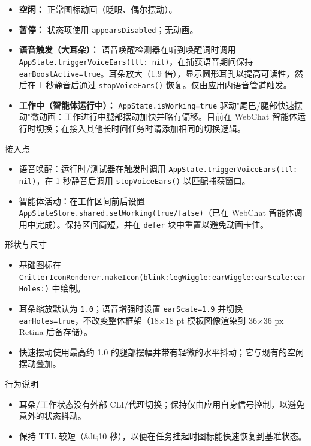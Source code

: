 \begin{itemize}
  \item \textbf{空闲：} 正常图标动画（眨眼、偶尔摆动）。
  \item \textbf{暂停：} 状态项使用 \texttt{appearsDisabled}；无动画。
  \item \textbf{语音触发（大耳朵）：} 语音唤醒检测器在听到唤醒词时调用 \texttt{AppState.triggerVoiceEars(ttl: nil)}，在捕获语音期间保持 \texttt{earBoostActive=true}。耳朵放大（1.9 倍），显示圆形耳孔以提高可读性，然后在 1 秒静音后通过 \texttt{stopVoiceEars()} 恢复。仅由应用内语音管道触发。
  \item \textbf{工作中（智能体运行中）：} \texttt{AppState.isWorking=true} 驱动"尾巴/腿部快速摆动"微动画：工作进行中腿部摆动加快并略有偏移。目前在 WebChat 智能体运行时切换；在接入其他长时间任务时请添加相同的切换逻辑。
\end{itemize}


接入点

\begin{itemize}
  \item 语音唤醒：运行时/测试器在触发时调用 \texttt{AppState.triggerVoiceEars(ttl: nil)}，在 1 秒静音后调用 \texttt{stopVoiceEars()} 以匹配捕获窗口。
  \item 智能体活动：在工作区间前后设置 \texttt{AppStateStore.shared.setWorking(true/false)}（已在 WebChat 智能体调用中完成）。保持区间简短，并在 \texttt{defer} 块中重置以避免动画卡住。
\end{itemize}


形状与尺寸

\begin{itemize}
  \item 基础图标在 \texttt{CritterIconRenderer.makeIcon(blink:legWiggle:earWiggle:earScale:earHoles:)} 中绘制。
  \item 耳朵缩放默认为 \texttt{1.0}；语音增强时设置 \texttt{earScale=1.9} 并切换 \texttt{earHoles=true}，不改变整体框架（18×18 pt 模板图像渲染到 36×36 px Retina 后备存储）。
  \item 快速摆动使用最高约 1.0 的腿部摆幅并带有轻微的水平抖动；它与现有的空闲摆动叠加。
\end{itemize}


行为说明

\begin{itemize}
  \item 耳朵/工作状态没有外部 CLI/代理切换；保持仅由应用自身信号控制，以避免意外的状态抖动。
  \item 保持 TTL 较短（\&lt;10 秒），以便在任务挂起时图标能快速恢复到基准状态。
\end{itemize}



